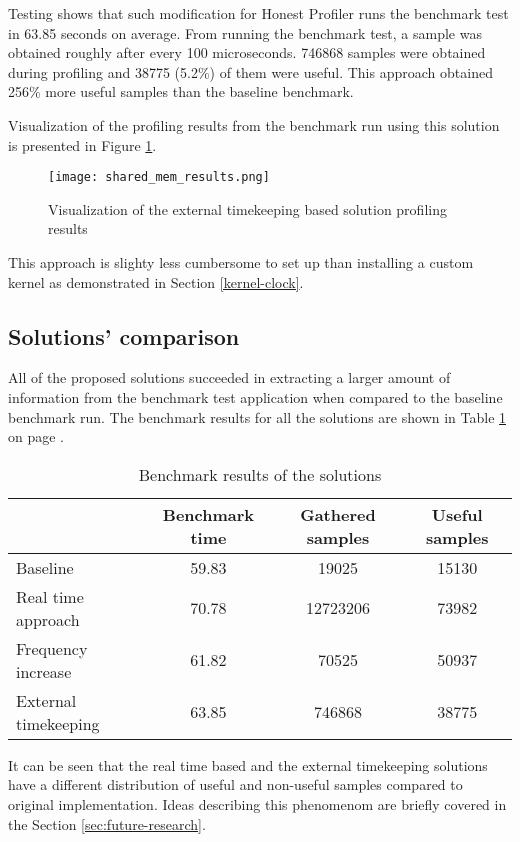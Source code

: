 \documentclass[..thesis.tex]{subfiles}
\begin{document}

Testing shows that such modification for Honest Profiler runs the benchmark test in 63.85 seconds on average.  From running the benchmark test, a sample was obtained roughly after every 100 microseconds. 746868 samples were obtained during profiling and 38775 (5.2\%) of them were useful. This approach obtained 256\% more useful samples than the baseline benchmark.

Visualization of the profiling results from the benchmark run using this solution is presented in Figure \ref{fig:shared-mem-results}.
\begin{figure}[H]
\texttt{[image: shared\_mem\_results.png]}
\caption{Visualization of the external timekeeping based solution profiling results}
\label{fig:shared-mem-results}
\end{figure} 

This approach is slighty less cumbersome to set up than installing a custom kernel as demonstrated in Section \ref{kernel-clock}. 

\subsection{Solutions' comparison}
All of the proposed solutions succeeded in extracting a larger amount of information from the benchmark test application when compared to the baseline benchmark run.
The benchmark results for all the solutions are shown in Table \ref{table:results} on page \pageref{table:results}. 

\begin{table}[H]
\centering
\caption{Benchmark results of the solutions}
\label{table:results}

\begin{tabular}{l | c | c | c}
 & Benchmark time  & Gathered samples&  Useful samples  \\
 \hline
Baseline & 59.83 & 19025 & 15130  \\
Real time approach & 70.78 & 12723206 & 73982 \\
Frequency increase & 61.82 & 70525 & 50937  \\
External timekeeping & 63.85 & 746868 & 38775 
\end{tabular}
\end{table}

It can be seen that the real time based and the external timekeeping solutions have a different distribution of useful and non-useful samples compared to original implementation. Ideas describing this phenomenom are briefly covered in the Section \ref{sec:future-research}.
\end{document}
